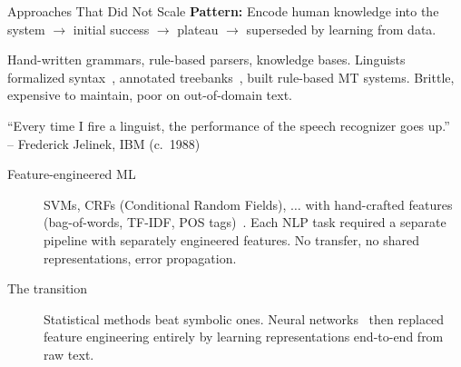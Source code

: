 \begin{frame}{Approaches That Did Not Scale}
  \textbf{Pattern:} Encode human knowledge into the system $\to$ initial success $\to$ plateau $\to$ superseded by learning from data.

  \begin{description}[style=nextline]
    \item[Symbolic / grammar-based] Hand-written grammars, rule-based parsers, knowledge bases. Linguists formalized syntax~\cite{chomsky1957syntactic}, annotated treebanks~\cite{marcus1993treebank}, built rule-based MT systems. Brittle, expensive to maintain, poor on out-of-domain text.
  \end{description}
  \vspace{0.3em}
  {\small ``Every time I fire a linguist, the performance of the speech recognizer goes up.''\\
  \hfill -- Frederick Jelinek, IBM (c.\ 1988)~\cite{jelinek2005history}}
  \begin{description}
    \item[Feature-engineered ML] SVMs, CRFs (Conditional Random Fields), $\ldots$ with hand-crafted features (bag-of-words, TF-IDF, POS tags)~\cite{joachims1998text}. Each NLP task required a separate pipeline with separately engineered features. No transfer, no shared representations, error propagation.
    \item[The transition] Statistical methods beat symbolic ones. Neural networks~\cite{collobert2011nlp} then replaced feature engineering entirely by learning representations end-to-end from raw text.
  \end{description}
\end{frame}

